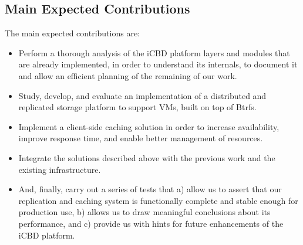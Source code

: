 


\subsection{Main Expected Contributions} %
\label{sub:intro_main_expected_contributions}

The main expected contributions are: 

\begin{itemize}
  \item Perform a thorough analysis of the iCBD platform layers and modules that are already implemented, in order to understand its internals, to document it and allow an efficient planning of the remaining of our work. 
  \item Study, develop, and evaluate an implementation of a distributed and replicated storage platform to support VMs, built on top of Btrfs.
  \item Implement a client-side caching solution in order to increase availability, improve response time, and enable better management of resources.
  \item Integrate the solutions described above with the previous work and the existing infrastructure.
  \item And, finally, carry out a series of tests that a) allow us to assert that our replication and caching system is functionally complete and stable enough for production use, b) allows us to draw meaningful conclusions about its performance, and c) provide us with hints for future enhancements of the iCBD platform.
\end{itemize}




